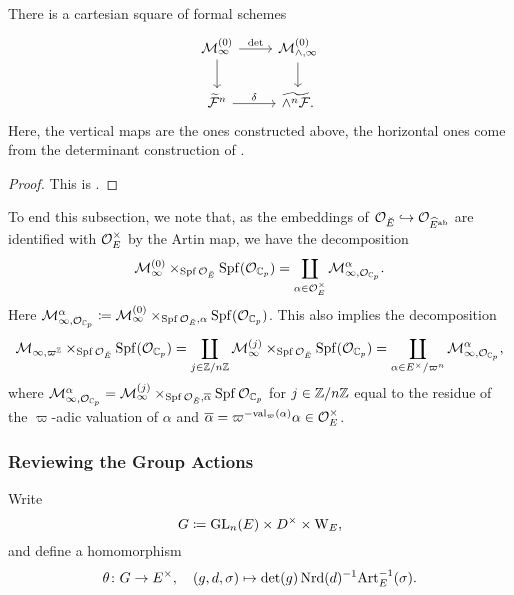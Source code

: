 \documentclass[../main.tex]{subfiles}
\begin{document}
\begin{thm}\label{thm:WeinsteinsCartesianSquare}
  There is a cartesian square of formal schemes
  \begin{equation*}
    \begin{tikzcd}[ampersand replacement=\&]
      {\cM_\infty^{(0)}} \& {\cM_{\wedge, \infty}^{(0)}} \\
    	{\widetilde \cF^n} \& {\widetilde{\wedge^n \cF}.}
    	\arrow["\det", from=1-1, to=1-2]
    	\arrow[from=1-1, to=2-1]
    	\arrow[from=1-2, to=2-2]
    	\arrow["\delta", from=2-1, to=2-2]
    \end{tikzcd}
  \end{equation*}
  Here, the vertical maps are the ones constructed above, the horizontal ones
  come from the determinant construction of \cite{hedayatzadeh2015det}. 
\begin{proof}
  This is \cite[Theorem 2.17]{weinstein2016semistable}.
\end{proof}
\end{thm}


To end this subsection, we note that, as the embeddings of 
$\mathcal{O}_{\breve {E}} \hookrightarrow \mathcal{O}_{\widehat E^{\mathrm{ab}}}$ are identified with $\mathcal{O}_E^\times$ by
the Artin map, we have the decomposition
\begin{equation}\label{eq:decompofcMinftyZEROtensorwithOCp}
  \mathcal{M}_{\infty}^{(0)} \times_{\operatorname{Spf} \mathcal{O}_{\breve {E}}} \operatorname{Spf}(\mathcal{O}_{\mathbb{C}_p})
  = \coprod_{\alpha \in \mathcal{O}_E^\times} \mathcal{M}_{\infty, \mathcal{O}_{\mathbb{C}_p}}^\alpha.
\end{equation}
Here $\mathcal{M}_{\infty, \mathcal{O}_{\mathbb{C}_p}}^\alpha \coloneqq \mathcal{M}_{\infty}^{(0)} \times_{\operatorname{Spf} \mathcal{O}_{\breve {E}},
\alpha} \operatorname{Spf}(\mathcal{O}_{\mathbb{C}_p})$.
This also implies the decomposition 
\begin{equation}\label{eq:decompOfMInftyQuotTensorWithOCp}
  \mathcal{M}_{\infty, \varpi^{\mathbb{Z}}} \times_{\operatorname{Spf} \mathcal{O}_{\breve {E}}} \operatorname{Spf} (\mathcal{O}_{\mathbb{C}_p}) = 
  \coprod_{j \in \mathbb{Z}/n\mathbb{Z}} \mathcal{M}_{\infty}^{(j)}\times_{\operatorname{Spf} \mathcal{O}_{\breve {E}}} \operatorname{Spf}(\mathcal{O}_{\mathbb{C}_p})
  = \coprod_{\alpha \in E^\times/\varpi^n} \mathcal{M}_{\infty, \mathcal{O}_{\mathbb{C}_p}}^{\alpha},
\end{equation}
where $\mathcal{M}_{\infty, \mathcal{O}_{\mathbb{C}_p}}^\alpha = \mathcal{M}_{\infty}^{(j)} \times_{\operatorname{Spf} \mathcal{O}_{\breve {E}},
\overline \alpha} \operatorname{Spf} \mathcal{O}_{\mathbb{C}_p}$ for $j \in \mathbb{Z}/n\mathbb{Z}$ equal to the residue of the
$\varpi$-adic valuation of $\alpha$ and $\overline \alpha =
\varpi^{-\mathrm{val}_\varpi(\alpha)}\alpha \in \mathcal{O}_E^\times$.


\subsubsection{Reviewing the Group Actions} %
\label{ssub:Group Actions on the Universal Cover}
Write
\begin{equation*}
  G \coloneqq \operatorname{GL}_n(E) \times D^\times \times \mathrm W_E,
\end{equation*}
and define a homomorphism
\begin{equation*}
  \theta \colon G \to E^\times, \quad (g,d,\sigma) \mapsto \det(g) \operatorname{Nrd}(d)^{-1}
  \mathrm{Art}^{-1}_E(\sigma).
\end{equation*}
\end{document}
